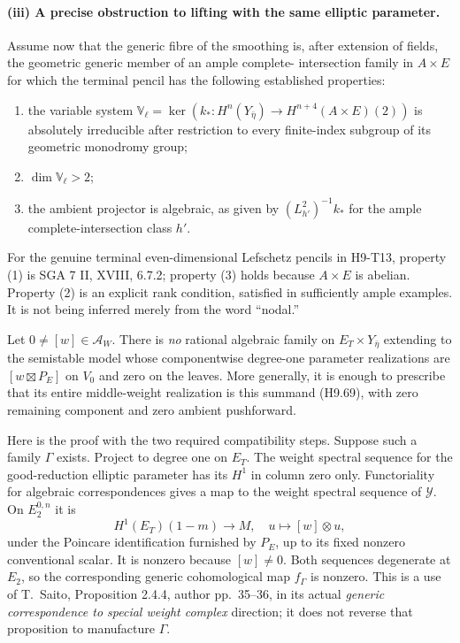 \paragraph{(iii) A precise obstruction to lifting with the same elliptic parameter.}
Assume now that the generic fibre of the smoothing is, after extension
of fields, the geometric generic member of an ample complete-
intersection family in $A\times E$ for which the terminal pencil
has the following established properties:
\begin{enumerate}
\item the variable system
$\mathbb V_\ell=\ker(k_*:H^n(Y_{\bar\eta})
       \to H^{n+4}(A\times E)(2))$
is absolutely irreducible after restriction to every finite-index
subgroup of its geometric monodromy group;
\item $\dim\mathbb V_\ell>2$;
\item the ambient projector is algebraic, as given by
$(L_{h'}^2)^{-1}k_*$ for the ample complete-intersection class $h'$.
\end{enumerate}
For the genuine terminal even-dimensional Lefschetz pencils in
H9-T13, property (1) is SGA 7 II, XVIII, 6.7.2; property (3) holds
because $A\times E$ is abelian. Property (2) is an explicit rank
condition, satisfied in sufficiently ample examples. It is not
being inferred merely from the word ``nodal.''

Let $0\ne[w]\in\mathcal A_W$. There is \emph{no} rational
algebraic family on $E_T\times Y_{\bar\eta}$ extending to the
semistable model whose componentwise degree-one parameter
realizations are $[w\boxtimes P_E]$ on $V_0$ and zero on the
leaves. More generally, it is enough to prescribe that its entire
middle-weight realization is this summand (H9.69), with zero
remaining component and zero ambient pushforward.

Here is the proof with the two required compatibility steps.
Suppose such a family $\Gamma$ exists. Project to degree one on
$E_T$. The weight spectral sequence for the good-reduction elliptic
parameter has its $H^1$ in column zero only. Functoriality for
algebraic correspondences gives a map to the weight spectral
sequence of $\mathcal Y$. On $E_2^{0,n}$ it is
\[
              H^1(E_T)(1-m)\longrightarrow M,
                       \quad u\longmapsto[w]\otimes u,
                                                               \tag{H9.73}
\]
under the Poincare identification furnished by $P_E$, up to its
fixed nonzero conventional scalar. It is nonzero because $[w]\ne0$.
Both sequences degenerate at $E_2$, so the corresponding generic
cohomological map $f_\Gamma$ is nonzero. This is a use of
T.~Saito, Proposition 2.4.4, author pp.~35--36, in its actual
\emph{generic correspondence to special weight complex} direction;
it does not reverse that proposition to manufacture $\Gamma$.

